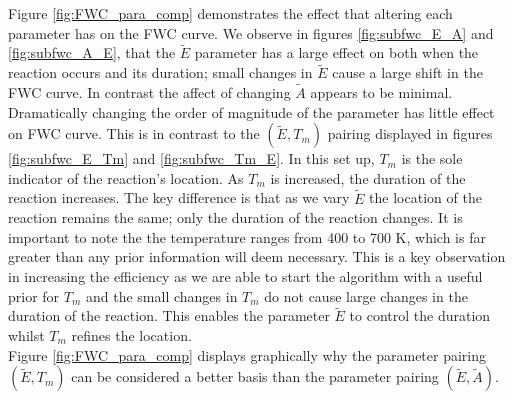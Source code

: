 Figure \ref{fig:FWC_para_comp} demonstrates the effect that altering each parameter has on the FWC curve. We observe in figures \ref{fig:subfwc_E_A} and \ref{fig:subfwc_A_E}, that the $\tilde{E}$ parameter has a large effect on both when the reaction occurs and its duration; small changes in $\tilde{E}$ cause a large shift in the FWC curve. In contrast the affect of changing $\tilde{A}$ appears to be minimal. Dramatically changing the order of magnitude of the parameter has little effect on FWC curve. This is in contrast to the $\left(\tilde{E},T_m\right)$ pairing displayed in figures \ref{fig:subfwc_E_Tm} and \ref{fig:subfwc_Tm_E}. In this set up, $T_m$ is the sole indicator of the reaction's location. As $T_m$ is increased, the duration of the reaction increases. The key difference is that as we vary $\tilde{E}$ the location of the reaction remains the same; only the duration of the reaction changes. It is important to note the the temperature ranges from 400 to 700 K, which is far greater than any prior information will deem necessary. This is a key observation in increasing the efficiency as we are able to start the algorithm with a useful prior for $T_m$ and the small changes in $T_m$ do not cause large changes in the duration of the reaction. This enables the parameter $\tilde{E}$ to control the duration whilst $T_m$ refines the location.\\
Figure \ref{fig:FWC_para_comp} displays graphically why the parameter pairing $\left(\tilde{E},T_m\right)$ can be considered a better basis than the parameter pairing $\left(\tilde{E},\tilde{A}\right)$.

